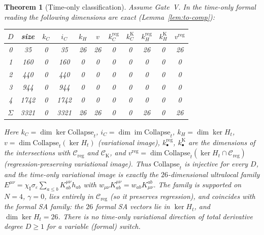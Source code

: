 \documentclass{article}
\newtheorem{theorem}[proposition]{Theorem}
\theoremstyle{remark}
\newcommand{\sigeps}{\sigma_\varepsilon}
\newcommand{\chiI}{\chi_{\mathrm I}}
\newcommand{\Creg}{\mathcal C_{\mathrm{reg}}}
\newcommand{\Coll}{\mathrm{Collapse}}
\begin{document}
\begin{theorem}[Time-only classification]
\label{thm:to-timeonly}
Assume Gate~V.
In the time-only formal reading the following dimensions are exact (Lemma~\ref{lem:to-comp}):
\begin{center}
\small
\begin{tabular}{c|c|cc|cc|cc|cc|c}
\hline
$D$ & size & $k_C$ & $i_C$ & $k_H$ & $v$ & $k_C^{\mathrm{reg}}$ & $k_C^{\mathrm K}$ & $k_H^{\mathrm{reg}}$ & $k_H^{\mathrm K}$ & $v^{\mathrm{reg}}$\\
\hline
0 & 35 & 0 & 35 & 26 & 26 & 0 & 0 & 26 & 0 & 26\\
1 & 160 & 0 & 160 & 0 & 0 & 0 & 0 & 0 & 0 & 0\\
2 & 440 & 0 & 440 & 0 & 0 & 0 & 0 & 0 & 0 & 0\\
3 & 944 & 0 & 944 & 0 & 0 & 0 & 0 & 0 & 0 & 0\\
4 & 1742 & 0 & 1742 & 0 & 0 & 0 & 0 & 0 & 0 & 0\\
\hline
$\Sigma$ & 3321 & 0 & 3321 & 26 & 26 & 0 & 0 & 26 & 0 & 26\\
\hline
\end{tabular}
\normalsize
\end{center}
Here $k_C=\dim\ker\Coll_t$, $i_C=\dim\operatorname{im}\Coll_t$, $k_H=\dim\ker H_t$, $v=\dim\Coll_t(\ker H_t)$ (variational image), $k^{\mathrm{reg}}_\bullet$, $k^{\mathrm K}_\bullet$ are the dimensions of the intersections with $\Creg$ and $\mathcal C_{\mathrm K}$, and $v^{\mathrm{reg}}=\dim\Coll_t(\ker H_t\cap\Creg)$ (regression-preserving variational image).
Thus $\Coll_t$ is injective for every $D$, and the time-only variational image is exactly the $26$-dimensional ultralocal family $E^{\mu\nu}=\chiI\sigeps\sum_{a\le b}K^{\mu\nu}_{ab}h_{ab}$ with $w_{\mu\nu}K^{\mu\nu}_{ab}=w_{ab}K^{ab}_{\mu\nu}$.
The family is supported on $N=4$, $\gamma=0$, lies entirely in $\Creg$ (so it preserves regression), and coincides with the formal SA family: the $26$ formal SA vectors lie in $\ker H_t$, and $\dim\ker H_t=26$.
There is no time-only variational direction of total derivative degree $D\ge1$ for a variable (formal) switch.
\end{theorem}
\end{document}
